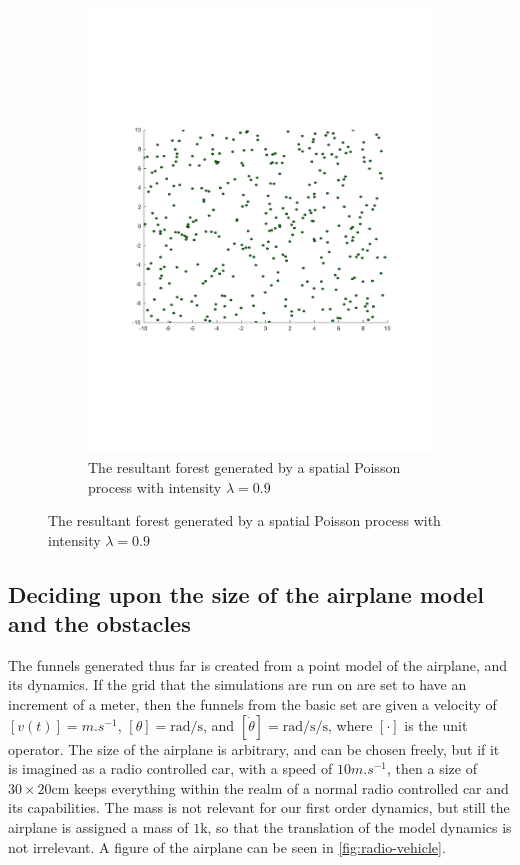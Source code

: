 \begin{figure}
\begin{subfigure}[b]{0.5\textwidth}
    \includegraphics[width=\textwidth]{figures/experiments/poisson09}
    \caption{The resultant forest generated by a spatial Poisson process with
      intensity \(\lambda = 0.9\)}
    \label{fig:poisson09}
  \end{subfigure}
\end{figure}

\subsection{Deciding upon the size of the airplane model and the obstacles}
\label{subsec:deciding-model-size}

The funnels generated thus far is created from a point model of the airplane,
and its dynamics. If the grid that the simulations are run on are set to have an
increment of a meter, then the funnels from the basic set are given a velocity
of \([v(t)] = \si{m.s^{-1}}\), \([\theta] = \si{\radian\per\second}\), and
\([\dot{\theta}] = \si{\radian\per\second\per\second}\), where \([\cdot]\) is
the unit operator. The size of the airplane is arbitrary, and can be chosen
freely, but if it is imagined as a radio controlled car, with a speed of
\(10\si{m.s^{-1}}\), then a size of \(30 \times 20 \si{\centi\metre} \) keeps
everything within the realm of a normal radio controlled car and its
capabilities. The mass is not relevant for our first order dynamics, but still
the airplane is assigned a mass of \(1 \si{\kilo}\), so that the translation of
the model dynamics is not irrelevant. A figure of the airplane can be seen in
\cref{fig:radio-vehicle}.

